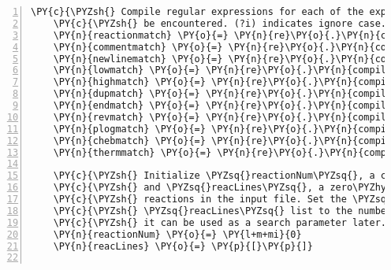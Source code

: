 \begin{Verbatim}[commandchars=\\\{\},fontsize=\small,numbers=left,firstnumber=1,stepnumber=2,firstline=2]
    \PY{c}{\PYZsh{} Compile regular expressions for each of the expected keywords to}
    \PY{c}{\PYZsh{} be encountered. (?i) indicates ignore case.}
    \PY{n}{reactionmatch} \PY{o}{=} \PY{n}{re}\PY{o}{.}\PY{n}{compile}\PY{p}{(}\PY{l+s}{r\PYZsq{}}\PY{l+s}{=(?!.*}\PY{l+s}{\PYZbs{}}\PY{l+s}{!)}\PY{l+s}{\PYZsq{}}\PY{p}{)}
    \PY{n}{commentmatch} \PY{o}{=} \PY{n}{re}\PY{o}{.}\PY{n}{compile}\PY{p}{(}\PY{l+s}{r\PYZsq{}}\PY{l+s}{\PYZca{}}\PY{l+s}{\PYZbs{}}\PY{l+s}{!}\PY{l+s}{\PYZsq{}}\PY{p}{)}
    \PY{n}{newlinematch} \PY{o}{=} \PY{n}{re}\PY{o}{.}\PY{n}{compile}\PY{p}{(}\PY{l+s}{r\PYZsq{}}\PY{l+s}{\PYZca{}}\PY{l+s}{\PYZbs{}}\PY{l+s}{n}\PY{l+s}{\PYZsq{}}\PY{p}{)}
    \PY{n}{lowmatch} \PY{o}{=} \PY{n}{re}\PY{o}{.}\PY{n}{compile}\PY{p}{(}\PY{l+s}{r\PYZsq{}}\PY{l+s}{(?i)\PYZca{}[}\PY{l+s}{\PYZbs{}}\PY{l+s}{s]*LOW}\PY{l+s}{\PYZsq{}}\PY{p}{)}
    \PY{n}{highmatch} \PY{o}{=} \PY{n}{re}\PY{o}{.}\PY{n}{compile}\PY{p}{(}\PY{l+s}{r\PYZsq{}}\PY{l+s}{(?i)\PYZca{}[}\PY{l+s}{\PYZbs{}}\PY{l+s}{s]*HIGH}\PY{l+s}{\PYZsq{}}\PY{p}{)}
    \PY{n}{dupmatch} \PY{o}{=} \PY{n}{re}\PY{o}{.}\PY{n}{compile}\PY{p}{(}\PY{l+s}{r\PYZsq{}}\PY{l+s}{(?i)}\PY{l+s}{\PYZbs{}}\PY{l+s}{bDUP}\PY{l+s}{\PYZbs{}}\PY{l+s}{b|}\PY{l+s}{\PYZbs{}}\PY{l+s}{bDUPLICATE}\PY{l+s}{\PYZbs{}}\PY{l+s}{b}\PY{l+s}{\PYZsq{}}\PY{p}{)}
    \PY{n}{endmatch} \PY{o}{=} \PY{n}{re}\PY{o}{.}\PY{n}{compile}\PY{p}{(}\PY{l+s}{r\PYZsq{}}\PY{l+s}{(?i)\PYZca{}END}\PY{l+s}{\PYZsq{}}\PY{p}{)}
    \PY{n}{revmatch} \PY{o}{=} \PY{n}{re}\PY{o}{.}\PY{n}{compile}\PY{p}{(}\PY{l+s}{r\PYZsq{}}\PY{l+s}{(?i)\PYZca{}[}\PY{l+s}{\PYZbs{}}\PY{l+s}{s]*REV}\PY{l+s}{\PYZsq{}}\PY{p}{)}
    \PY{n}{plogmatch} \PY{o}{=} \PY{n}{re}\PY{o}{.}\PY{n}{compile}\PY{p}{(}\PY{l+s}{r\PYZsq{}}\PY{l+s}{(?i)\PYZca{}[}\PY{l+s}{\PYZbs{}}\PY{l+s}{s]*PLOG}\PY{l+s}{\PYZsq{}}\PY{p}{)}
    \PY{n}{chebmatch} \PY{o}{=} \PY{n}{re}\PY{o}{.}\PY{n}{compile}\PY{p}{(}\PY{l+s}{r\PYZsq{}}\PY{l+s}{(?i)\PYZca{}[}\PY{l+s}{\PYZbs{}}\PY{l+s}{s]*CHEB}\PY{l+s}{\PYZsq{}}\PY{p}{)}
    \PY{n}{thermmatch} \PY{o}{=} \PY{n}{re}\PY{o}{.}\PY{n}{compile}\PY{p}{(}\PY{l+s}{r\PYZsq{}}\PY{l+s}{(?i)THERM ALL|THERMO ALL}\PY{l+s}{\PYZsq{}}\PY{p}{)}

    \PY{c}{\PYZsh{} Initialize \PYZsq{}reactionNum\PYZsq{}, a counter of the number of reactions,}
    \PY{c}{\PYZsh{} and \PYZsq{}reacLines\PYZsq{}, a zero\PYZhy{}based list of the line numbers of the}
    \PY{c}{\PYZsh{} reactions in the input file. Set the \PYZsq{}numRxns\PYZsq{} element of the}
    \PY{c}{\PYZsh{} \PYZsq{}reacLines\PYZsq{} list to the number of lines in the input file so that}
    \PY{c}{\PYZsh{} it can be used as a search parameter later.}
    \PY{n}{reactionNum} \PY{o}{=} \PY{l+m+mi}{0}
    \PY{n}{reacLines} \PY{o}{=} \PY{p}{[}\PY{p}{]}


\end{Verbatim}
